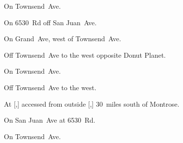 
\begin{LocationList}

On  Townsend~Ave.

On 6530~Rd off  San Juan~Ave.

On Grand~Ave, west of  Townsend~Ave.

Off  Townsend~Ave to the west opposite Donut Planet.

On  Townsend~Ave.

\Location{\GarageHQ \Garage}
Off  Townsend~Ave to the west.

At [,] accessed from  outside [,] 30~miles south of Montrose.

On  San Juan~Ave at 6530~Rd.

\Location{\TruckStop \Gas \Rest \Weigh}
On  Townsend~Ave.

\end{LocationList}
